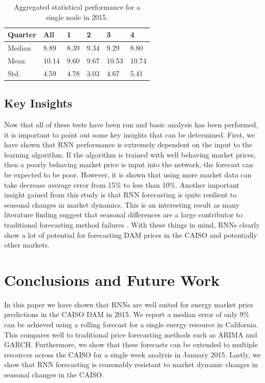 \documentclass[sigconf]{acmart}
\begin{document}
\begin{table}[h]
\begin{tabular}{llllll}
\hline
\hline
Quarter & All   & 1    & 2    & 3     & 4     \\
\hline
Median  & 8.89  & 8.39 & 9.34 & 9.29  & 8.80  \\
Mean    & 10.14 & 9.60 & 9.67 & 10.53 & 10.74 \\
Std.    & 4.59  & 4.78 & 3.03 & 4.67  & 5.41 \\
\hline
\hline
\end{tabular}
\caption{Aggregated statistical performance for a single node in 2015.}
\label{tab:single}
\end{table}

\subsection{Key Insights}

Now that all of these tests have been run and basic analysis has been performed, it is important to point out some key insights that can be determined. First, we have shown that RNN performance is extremely dependent on the input to the learning algorithm. If the algorithm is trained with well behaving market prices, then a poorly behaving market price is input into the network, the forecast can be expected to be poor. However, it is shown that using more market data can take decrease average error from 15\% to less than 10\%. Another important insight gained from this study is that RNN forecasting is quite resilient to seasonal changes in market dynamics. This is an interesting result as many literature finding suggest that seasonal differences are a large contributor to traditional forecasting method failures \cite{Conejo2005a,Garcia2005}. With these things in mind, RNNs clearly show a lot of potential for forecasting DAM prices in the CAISO and potentially other markets. 

\section{Conclusions and Future Work}
\label{sec:conclusions}

In this paper we have shown that RNNs are well suited for energy market price predictions in the CAISO DAM in 2015. We report a median error of only 9\% can be achieved using a rolling forecast for a single energy resource in California. This compares well to traditional price forecasting methods such as ARIMA and GARCH. Furthermore, we show that these forecasts can be extended to multiple resources across the CAISO for a single week analysis in January 2015. Lastly, we show that RNN forecasting is reasonably resistant to market dynamic changes in seasonal changes in the CAISO.\\
\end{document}
